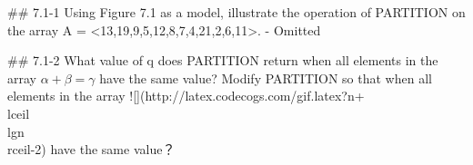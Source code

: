 
## 7.1-1 Using Figure 7.1 as a model, illustrate the operation of PARTITION on the array A = <13,19,9,5,12,8,7,4,21,2,6,11>.
- Omitted

## 7.1-2  What value of q does PARTITION return when all elements in the array \(\alpha+\beta=\gamma\) have the same value? Modify PARTITION so that  when all elements in the array ![](http://latex.codecogs.com/gif.latex?n+\\lceil\\lg{n}\\rceil-2) have the same value？